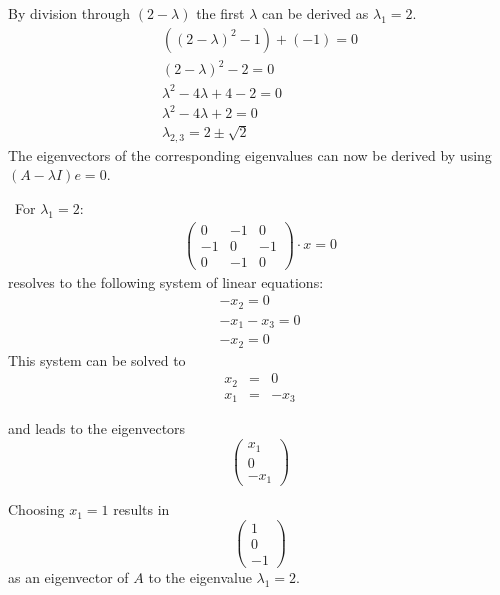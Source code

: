 \documentclass{article}
\begin{document}
By division through $(2- \lambda)$ the first $\lambda$ can be derived as $\lambda_1 = 2$.
\begin{eqnarray}
((2-\lambda)^2-1)+(-1) = 0 \\
(2-\lambda)^2-2 = 0 \\
\lambda^2-4\lambda+4-2 = 0 \\
\lambda^2-4\lambda+2 = 0 \\
\lambda_{2,3} = 2\pm \sqrt{2}
\end{eqnarray}
The eigenvectors of the corresponding eigenvalues can now be derived by using $(A - \lambda I)e = 0$.

\
For $\lambda_1 = 2$:
\begin{eqnarray}
\left(
\begin{array}{ccc}
0 & -1 & 0 \\
-1 & 0 & -1 \\
0 & -1 & 0
\end{array} \right) \cdot x = 0
\end{eqnarray}
resolves to the following system of linear equations:
\begin{eqnarray}
-x_2 = 0 \\
-x_1 -x_3 = 0 \\
-x_2 = 0
\end{eqnarray}
This system can be solved to
\begin{eqnarray}
x_2 &=& 0 \\
x_1 &=& -x_3
\end{eqnarray}

and leads to the eigenvectors
\begin{equation}
\left( \begin{array}{c}
x_1 \\ 0 \\ -x_1
\end{array} \right)
\end{equation}

Choosing $x_1 = 1$ results in
\begin{equation}
\left( \begin{array}{c}
1 \\ 0 \\ -1
\end{array} \right)
\end{equation}
as an eigenvector of $A$ to the eigenvalue $\lambda_1 = 2$.
\end{document}
